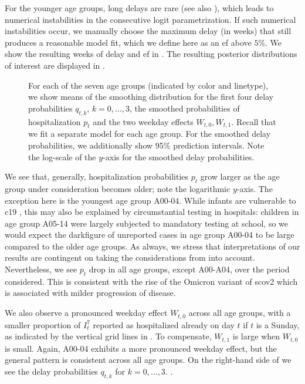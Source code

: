 For the younger age groups, long delays are rare (see also ), which leads to numerical instabilities in the consecutive logit parametrization. If such numerical instabilities occur, we manually choose the maximum delay (in weeks) that still produces a reasonable model fit, which we define here as an \acrshort{ef} above $5\%$. We show the resulting weeks of delay and \acrshort{ef} in . The resulting posterior distributions of interest are displayed in . 

\begin{figure}
    \resizebox{\textwidth}{!}{%
    }
    \caption{For each of the seven age groups (indicated by color and linetype), we show means of the smoothing distribution for the first four delay probabilities $q_{t,k}$, $k = 0,\dots, 3$, the smoothed probabilities of hospitalization $p_t$ and the two weekday effects $W_{t,0}, W_{t,1}$. Recall that we fit a separate model for each age group. For the smoothed delay probabilities, we additionally show 95\% prediction intervals. Note the log-scale of the $y$-axis for the smoothed delay probabilities. %
    }
    \label{fig:hospitalization_showcase_results}
\end{figure}

We see that, generally, hospitalization probabilities $p_{t}$ grow larger as the age group under consideration becomes older; note the logarithmic $y$-axis. The exception here is the youngest age group A00-04. While infants are vulnerable to \acrshort{c19} \citep{Havers2024COVID19Associateda}, this may also be explained by circumstantial testing in hospitals: children in age group A05-14 were largely  subjected to mandatory testing at school, so we would expect the darkfigure of unreported cases in age group A00-04 to be large compared to the older age groups. As always, we stress that interpretations of our results are contingent on taking the considerations from  into account. 
Nevertheless, we see $p_{t}$ drop in all age groups, except A00-A04, over the period considered. This is consistent with the rise of the Omicron variant of \acrshort{scov2} \citep{RobertKoch-Institut2024SARSCoV2b} which is associated with milder progression of disease. 

We also observe a pronounced weekday effect $W_{t,0}$ across all age groups, with a smaller proportion of $I^{7}_{t}$ reported as hospitalized already on day $t$ if $t$ is a Sunday, as indicated by the vertical grid lines in . To compensate, $W_{t,1}$ is large when $W_{t,0}$ is small. Again, A00-04 exhibits a more pronounced weekday effect, but the general pattern is consistent across all age groups. 
On the right-hand side of  we see the delay probabilities $q_{t,k}$ for $k=0, \dots, 3$. .

